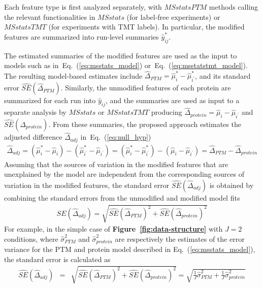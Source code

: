 \documentclass[mcp]{article}
\numberwithin{table}{section}
\def\eqref#1{Eq.~(\ref{eq:#1})}
\def\figref#1{{\bf Figure~\ref{fig:#1}}}
\begin{document}
Each feature type is first analyzed separately, with $MSstatsPTM$ methods calling the relevant functionalities in $MSstats$ (for label-free experiments) or $MSstatsTMT$ (for experiments with TMT labels). In particular, the modified features are summarized into run-level summaries $\hat{y}_{ij}^{\ast}$. 

The estimated summaries of the modified features are used as the input to models  such as in~\eqref{msstats_model} or~\eqref{msstatstmt_model}. The resulting model-based estimates include $\hat{\Delta}_{PTM}=\hat{\mu}^{\ast}_{i}-\hat{\mu}_{i^{\prime}}^{\ast}$, and its standard error $\widehat{SE}(\hat{\Delta}_{PTM})$. Similarly, the unmodified features of each protein are summarized for each run into $\hat{y}_{ij}$, and the summaries are used as input to a separate analysis by $MSstats$ or $MSstatsTMT$ producing $\hat{\Delta}_{protein}=\hat{\mu}_{i}-\hat{\mu}_{i^{\prime}}$ and $\widehat{SE}(\hat{\Delta}_{protein})$. From these summaries, the proposed approach estimates the adjusted difference $\hat{\Delta}_{adj}$ in~\eqref{null_hyp}
\begin{eqnarray}
\hat{\Delta}_{adj} = (\hat{\mu}^{\ast}_{i}-\hat{\mu}_{i}) - (\hat{\mu}_{i^{\prime}}^{\ast}-\hat{\mu}_{i^{\prime}}) = (\hat{\mu}^{\ast}_{i}-\hat{\mu}_{i^{\prime}}^{\ast}) - (\hat{\mu}_{i}-\hat{\mu}_{i^{\prime}}) = \hat{\Delta}_{PTM} - \hat{\Delta}_{protein} 
\label{eq:Delta_hat_adj}
\end{eqnarray}
Assuming that the sources of variation in the modified features that are unexplained by the model are independent from the corresponding sources of variation in the modified features, the standard error $\widehat{SE}(\hat{\Delta}_{adj})$ is obtained by combining the standard errors from the unmodified and modified model fits
\begin{eqnarray}
\widehat{SE}(\hat{\Delta}_{adj}) = \sqrt{ \widehat{SE}(\hat{\Delta}_{PTM})^{2} + \widehat{SE}(\hat{\Delta}_{protein})^{2}} 
\label{eq:prop_se}
\end{eqnarray}
For example, in the simple case of \figref{data-structure} with $J=2$ conditions, where $\hat{\sigma}^2_{PTM}$ and $\hat{\sigma}^2_{protein}$ are respectively  the estimates of the error variance for the PTM and protein model described in \eqref{msstats_model}, the standard error is calculated as 
\begin{eqnarray}
 \widehat{SE}(\hat{\Delta}_{adj}) &=& \sqrt{\widehat{SE}(\hat{\Delta}_{PTM})^2 + \widehat{SE}(\hat{\Delta}_{protein})^2} = \sqrt{\frac{1}{J}\hat{\sigma}^2_{PTM} + \frac{1}{J}\hat{\sigma}^2_{protein}}
\label{eq:se_calc}
\end{eqnarray}
\end{document}
